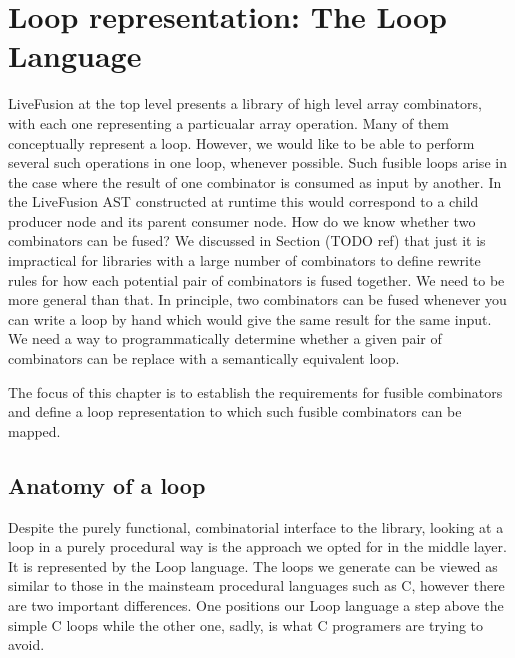 \documentclass[preamble.tex]{subfiles}
\begin{document}
\clearpage

\chapter{Loop representation: The Loop Language}

LiveFusion at the top level presents a library of high level array combinators, with each one representing a particualar array operation. Many of them conceptually represent a loop. However, we would like to be able to perform several such operations in one loop, whenever possible. Such fusible loops arise in the case where the result of one combinator is consumed as input by another. In the LiveFusion AST constructed at runtime this would correspond to a child producer node and its parent consumer node. How do we know whether two combinators can be fused? We discussed in Section (TODO ref) that just it is impractical for libraries with a large number of combinators to define rewrite rules for how each potential pair of combinators is fused together. We need to be more general than that. In principle, two combinators can be fused whenever you can write a loop by hand which would give the same result for the same input. We need a way to programmatically determine whether a given pair of combinators can be replace with a semantically equivalent loop.

The focus of this chapter is to establish the requirements for fusible combinators and define a loop representation to which such fusible combinators can be mapped.







\section{Anatomy of a loop}

Despite the purely functional, combinatorial interface to the library, looking at a loop in a purely procedural way is the approach we opted for in the middle layer. It is represented by the Loop language. The loops we generate can be viewed as similar to those in the mainsteam procedural languages such as C, however there are two important differences. One positions our Loop language a step above the simple C loops while the other one, sadly, is what C programers are trying to avoid.
\end{document}

